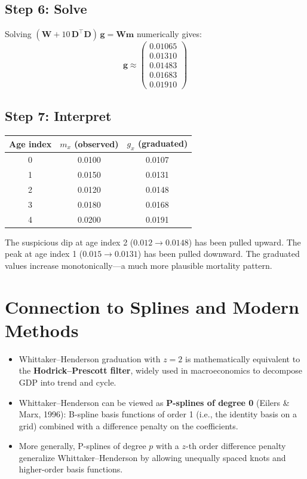 \documentclass[11pt,a4paper]{article}
\begin{document}
\subsection*{Step 6: Solve}

Solving $(\bm{W} + 10\,\bm{D}^\top\bm{D})\,\bm{g} = \bm{W}\bm{m}$ numerically gives:
\[
\bm{g} \approx \begin{pmatrix} 0.01065 \\ 0.01310 \\ 0.01483 \\ 0.01683 \\ 0.01910 \end{pmatrix}
\]

\subsection*{Step 7: Interpret}

\begin{center}
\renewcommand{\arraystretch}{1.2}
\begin{tabular}{ccc}
\toprule
\textbf{Age index} & $m_x$ \textbf{(observed)} & $g_x$ \textbf{(graduated)} \\
\midrule
0 & 0.0100 & 0.0107 \\
1 & 0.0150 & 0.0131 \\
2 & 0.0120 & 0.0148 \\
3 & 0.0180 & 0.0168 \\
4 & 0.0200 & 0.0191 \\
\bottomrule
\end{tabular}
\end{center}

The suspicious dip at age index 2 ($0.012 \to 0.0148$) has been pulled upward.  The peak at age index 1 ($0.015 \to 0.0131$) has been pulled downward.  The graduated values increase monotonically---a much more plausible mortality pattern.

\section{Connection to Splines and Modern Methods}

\begin{formaldef}[Equivalences]
\begin{itemize}[nosep]
  \item Whittaker--Henderson graduation with $z=2$ is mathematically equivalent to the \textbf{Hodrick--Prescott filter}, widely used in macroeconomics to decompose GDP into trend and cycle.
  \item Whittaker--Henderson can be viewed as \textbf{P-splines of degree 0} (Eilers \& Marx, 1996): B-spline basis functions of order 1 (i.e., the identity basis on a grid) combined with a difference penalty on the coefficients.
  \item More generally, P-splines of degree $p$ with a $z$-th order difference penalty generalize Whittaker--Henderson by allowing unequally spaced knots and higher-order basis functions.
\end{itemize}
\end{formaldef}
\end{document}
